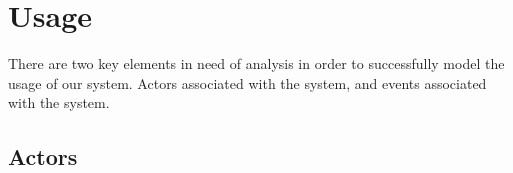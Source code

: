 \section{Usage}

There are two key elements in need of analysis in order to successfully model the usage of our system. Actors associated with the system, and events associated with the system.

\subsection{Actors}



